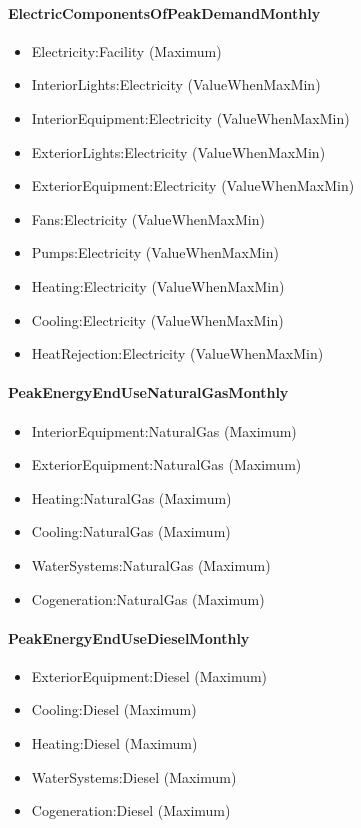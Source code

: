 \paragraph{ElectricComponentsOfPeakDemandMonthly}\label{electriccomponentsofpeakdemandmonthly}

\begin{itemize}
\item
  Electricity:Facility (Maximum)
\item
  InteriorLights:Electricity (ValueWhenMaxMin)
\item
  InteriorEquipment:Electricity (ValueWhenMaxMin)
\item
  ExteriorLights:Electricity (ValueWhenMaxMin)
\item
  ExteriorEquipment:Electricity (ValueWhenMaxMin)
\item
  Fans:Electricity (ValueWhenMaxMin)
\item
  Pumps:Electricity (ValueWhenMaxMin)
\item
  Heating:Electricity (ValueWhenMaxMin)
\item
  Cooling:Electricity (ValueWhenMaxMin)
\item
  HeatRejection:Electricity (ValueWhenMaxMin)
\end{itemize}

\paragraph{PeakEnergyEndUseNaturalGasMonthly}\label{peakenergyendusenaturalgasmonthly}

\begin{itemize}
\item
  InteriorEquipment:NaturalGas (Maximum)
\item
  ExteriorEquipment:NaturalGas (Maximum)
\item
  Heating:NaturalGas (Maximum)
\item
  Cooling:NaturalGas (Maximum)
\item
  WaterSystems:NaturalGas (Maximum)
\item
  Cogeneration:NaturalGas (Maximum)
\end{itemize}

\paragraph{PeakEnergyEndUseDieselMonthly}\label{peakenergyendusedieselmonthly}

\begin{itemize}
\item
  ExteriorEquipment:Diesel (Maximum)
\item
  Cooling:Diesel (Maximum)
\item
  Heating:Diesel (Maximum)
\item
  WaterSystems:Diesel (Maximum)
\item
  Cogeneration:Diesel (Maximum)
\end{itemize}

